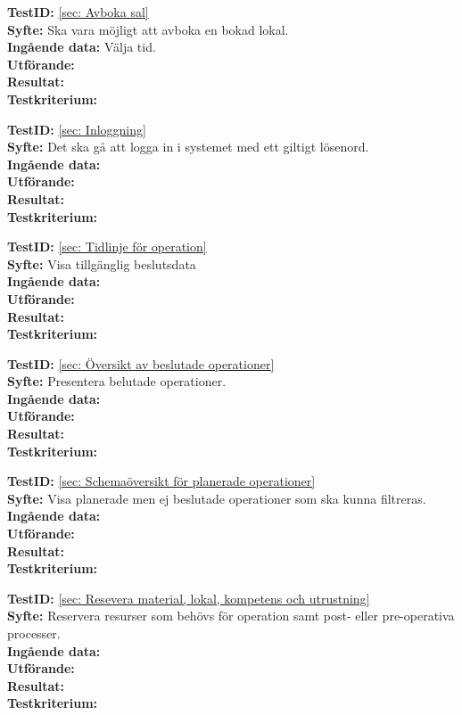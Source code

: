 \documentclass[a4paper,10pt]{article}
\begin{document}
  \textbf{TestID:} \ref{sec: Avboka sal}
  \\ \textbf{Syfte:} Ska vara möjligt att avboka en bokad lokal.
  \\ \textbf{Ingående data:} Välja tid.  
  \\ \textbf{Utförande:} 
  \\ \textbf{Resultat:}	
  \\ \textbf{Testkriterium:}
  
  \textbf{TestID:} \ref{sec: Inloggning}
  \\ \textbf{Syfte:} Det ska gå att logga in i systemet med ett giltigt lösenord.
  \\ \textbf{Ingående data:} 
  \\ \textbf{Utförande:} 
  \\ \textbf{Resultat:}	
  \\ \textbf{Testkriterium:}
  
  \textbf{TestID:} \ref{sec: Tidlinje för operation}
  \\ \textbf{Syfte:} Visa tillgänglig beslutsdata  
  \\ \textbf{Ingående data:}   
  \\ \textbf{Utförande:} 
  \\ \textbf{Resultat:}	
  \\ \textbf{Testkriterium:}
  
  \textbf{TestID:} \ref{sec: Översikt av beslutade operationer}
  \\ \textbf{Syfte:} Presentera belutade operationer.
  \\ \textbf{Ingående data:}   
  \\ \textbf{Utförande:} 
  \\ \textbf{Resultat:}	
  \\ \textbf{Testkriterium:}
  
  \textbf{TestID:} \ref{sec: Schemaöversikt för planerade operationer}
  \\ \textbf{Syfte:} Visa planerade men ej beslutade operationer som ska kunna filtreras.
  \\ \textbf{Ingående data:} 
  \\ \textbf{Utförande:} 
  \\ \textbf{Resultat:}	
  \\ \textbf{Testkriterium:}
  
  \textbf{TestID:} \ref{sec: Resevera material, lokal, kompetens och utrustning}
  \\ \textbf{Syfte:} Reservera resurser som behövs för operation samt post- eller pre-operativa processer.
  \\ \textbf{Ingående data:} 
  \\ \textbf{Utförande:} 
  \\ \textbf{Resultat:}	
  \\ \textbf{Testkriterium:}
  
\end{document}
